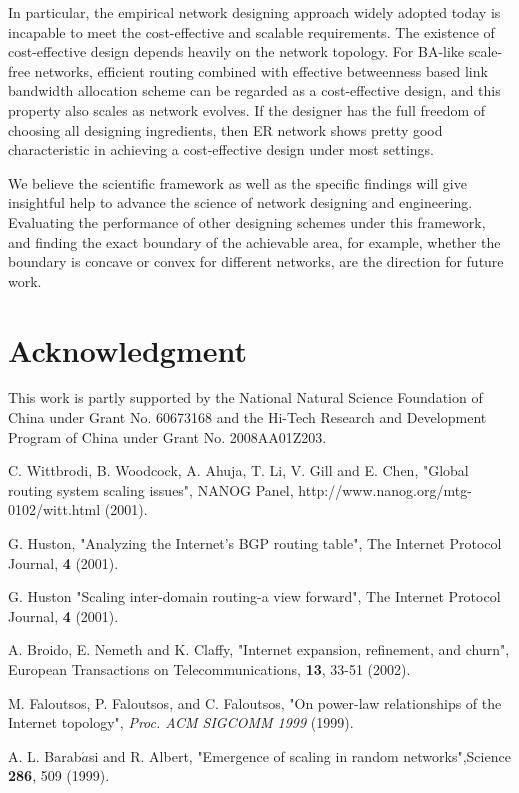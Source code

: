 \documentclass[journal]{IEEEtran}
\begin{document}
{In particular, the empirical network designing approach widely
adopted today is incapable to meet the cost-effective and scalable
requirements. The existence of cost-effective design depends heavily
on the network topology. For BA-like scale-free networks, efficient
routing combined with effective betweenness based link bandwidth
allocation scheme can be regarded as a cost-effective design, and
this property also scales as network evolves. If the designer has
the full freedom of choosing all designing ingredients, then ER
network shows pretty good characteristic in achieving a
cost-effective design under most settings.

We believe the scientific framework as well as the specific findings
will give insightful help to advance the science of network
designing and engineering. Evaluating the performance of other
designing schemes under this framework, and finding the exact
boundary of the achievable area, for example, whether the boundary
is concave or convex for different networks, are the direction for
future work.
\section*{Acknowledgment}
This work is partly supported by the National Natural Science
Foundation of China under Grant No. 60673168 and the Hi-Tech
Research and Development Program of China under Grant No.
2008AA01Z203.


 \begin{thebibliography}{5}

 C. Wittbrodi, B. Woodcock, A. Ahuja, T.
Li, V. Gill and E. Chen, "Global routing system scaling issues",
NANOG Panel, http://www.nanog.org/mtg-0102/witt.html (2001).

 G. Huston, "Analyzing the Internet's BGP routing
table", The Internet Protocol Journal, {\bf 4} (2001).

 G. Huston "Scaling inter-domain routing-a view
forward", The Internet Protocol Journal, {\bf 4} (2001).

 A. Broido, E. Nemeth and K. Claffy, "Internet
expansion, refinement, and churn", European Transactions on
Telecommunications, {\bf 13}, 33-51 (2002).


 M. Faloutsos, P. Faloutsos, and C. Faloutsos,
"On power-law relationships of the Internet topology", \emph{Proc.
ACM SIGCOMM 1999} (1999).

 A. L. Barab$\acute{a}$si and R. Albert, "Emergence of scaling in random networks",Science {\bf 286}, 509
(1999).


\end{thebibliography}}
\end{document}

